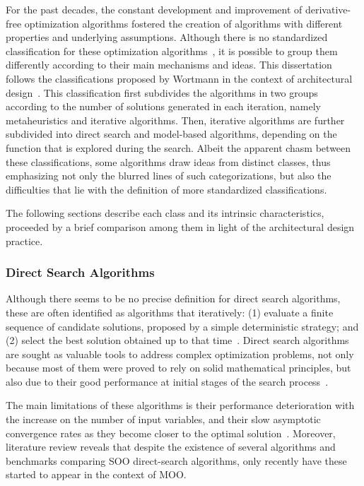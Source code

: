 	For the past decades, the constant development and improvement of derivative-free optimization algorithms fostered the creation of algorithms with different properties and underlying assumptions. Although there is no standardized classification for these optimization algorithms~\cite{Rios2013, Wortmann2017ADO}, it is possible to group them differently according to their main mechanisms and ideas. This dissertation follows the classifications proposed by Wortmann in the context of architectural design~\cite{Wortmann2017ADO}. This classification first subdivides the algorithms in two groups according to the number of solutions generated in each iteration, namely metaheuristics and iterative algorithms. Then, iterative algorithms are further subdivided into direct search and model-based algorithms, depending on the function that is explored during the search. Albeit the apparent chasm between these classifications, some algorithms draw ideas from distinct classes, thus emphasizing not only the blurred lines of such categorizations, but also the difficulties that lie with the definition of more standardized classifications. 
	
	The following sections describe each class and its intrinsic characteristics, proceeded by a brief comparison among them in light of the architectural design practice. 	
	
	\subsubsection{Direct Search Algorithms}
	\label{ssec:direct-search}
	
	Although there seems to be no precise definition for direct search algorithms, these are often identified as algorithms that iteratively: (1) evaluate a finite sequence of candidate solutions, proposed by a simple deterministic strategy; and (2) select the best solution obtained up to that time~\cite{Kolda2003,Wortmann2016BBO}. Direct search algorithms are sought as valuable tools to address complex optimization problems, not only because most of them were proved to rely on solid mathematical principles, but also due to their good performance at initial stages of the search process~\cite{Rios2013}. 
	
	The main limitations of these algorithms is their performance deterioration with the increase on the number of input variables, and their slow asymptotic convergence rates as they become closer to the optimal solution~\cite{Kolda2003}. Moreover, literature review reveals that despite the existence of several algorithms and benchmarks comparing \ac{SOO} direct-search algorithms, only recently have these started to appear in the context of \ac{MOO}. 
	
